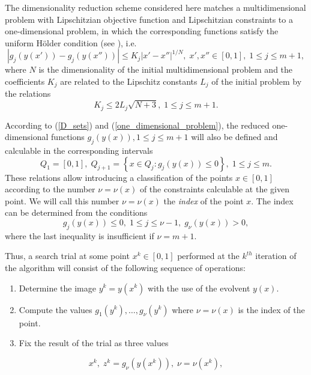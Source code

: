 \documentclass[review]{elsarticle}
\begin{document}
	The dimensionality reduction scheme considered here matches a multidimensional problem with Lipschitzian objective function and Lipschitzian constraints to a one-dimensional problem, in which the corresponding functions satisfy the uniform H\"{o}lder condition (see \cite{Strongin2000, Sergeyev2013}), i.e.
$$
	\left|g_j(y(x'))-g_j(y(x''))\right| \leq K_j \left|x'-x'' \right|^{1/N}, \; x', x''\in [0,1], \; 1\leq j \leq m+1,
$$
where $N$ is the dimensionality of the initial multidimensional problem and the coefficients $K_j$ are related to the Lipschitz constants $L_j$ of the initial problem by the relations
\begin{equation}\label{K_leq_L}
	K_j \leq 2L_j \sqrt{N+3}, \; 1\leq j \leq m+1.
\end{equation}

	According to (\ref{D_sets}) and (\ref{one_dimensional_problem}), the reduced one-dimensional functions $g_j (y(x)), 1 \leq j \leq m+1$ will also be defined and calculable in the corresponding intervals 
\begin{equation}\label{Q_intervals}
	Q_1=[0,1], \; Q_{j+1}=\left\{x \in Q_j : g_j(y(x)) \leq 0 \right\}, \; 1 \leq j \leq m.
\end{equation}
These relations allow introducing a classification of the points $x \in [0,1]$ according to the number $\nu = \nu(x)$ of the constraints calculable at the given point. We will call this number $\nu = \nu(x)$ the \textit{index} of the point $x$. The index can be determined from the conditions 
$$
	g_j(y(x)) \leq 0, \; 1 \leq j \leq \nu-1, \; g_{\nu}(y(x))>0,
$$
where the last inequality is insufficient if $\nu = m+1$. 

	Thus, a search trial at some point $x^k \in [0,1]$ performed at the $k^{th}$ iteration of the algorithm will consist of the following sequence of operations:
\begin{enumerate} 
  \item Determine the image $y^k=y(x^k )$ with the use of the evolvent $y(x)$. 
  \item Compute the values $g_1 (y^k ), \ldots ,g_{\nu} (y^k )$ where $\nu = \nu(x)$ is the index of the point.
	\item Fix the result of the trial as three values 
\end{enumerate}
	
\begin{equation}\label{trial_result}
	x^k, \; z^k = g_{\nu}\left( y(x^k) \right), \; \nu = \nu(x^k),
\end{equation}
\end{document}
